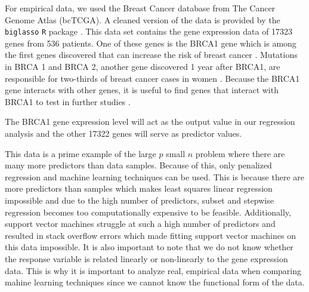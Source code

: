 \documentclass[final,onefignum,onetabnum]{siuro210301}
\begin{document}
	For empirical data, we used the Breast Cancer database from The Cancer Genome Atlas (bcTCGA). A cleaned version of the data is provided by the \lstinline!biglasso! \lstinline!R! package \cite{zeng2017biglasso}. This data set contains the gene expression data of 17323 genes from 536 patients. One of these genes is the BRCA1 gene which is among the first genes discovered that can increase the risk of breast cancer \cite{kuchenbaecker2017risks, antoniou2003average}. Mutations in BRCA 1 and BRCA 2, another gene discovered 1 year after BRCA1, are responsible for two-thirds of breast cancer cases in women \cite{deng2000roles}. Because the BRCA1 gene interacts with other genes, it is useful to find genes that interact with BRCA1 to test in further studies \cite{deng2000roles}. 

	The BRCA1 gene expression level will act as the output value in our regression analysis and the other 17322 genes will serve as predictor values.
	

	
	This data is a prime example of the large $p$ small $n$ problem where there are many more predictors than data samples. Because of this, only penalized regression and machine learning techniques can be used. This is because there are more predictors than samples which makes least squares linear regression impossible and due to the high number of predictors, subset and stepwise regression becomes too computationally expensive to be feasible. Additionally, support vector machines struggle at such a high number of predictors and resulted in stack overflow errors which made fitting support vector machines on this data impossible. It is also important to note that we do not know whether the response variable is related linearly or non-linearly to the gene expression data. This is why it is important to analyze real, empirical data when comparing mahine learning techniques since we cannot know the functional form of the data.
	
\end{document}
